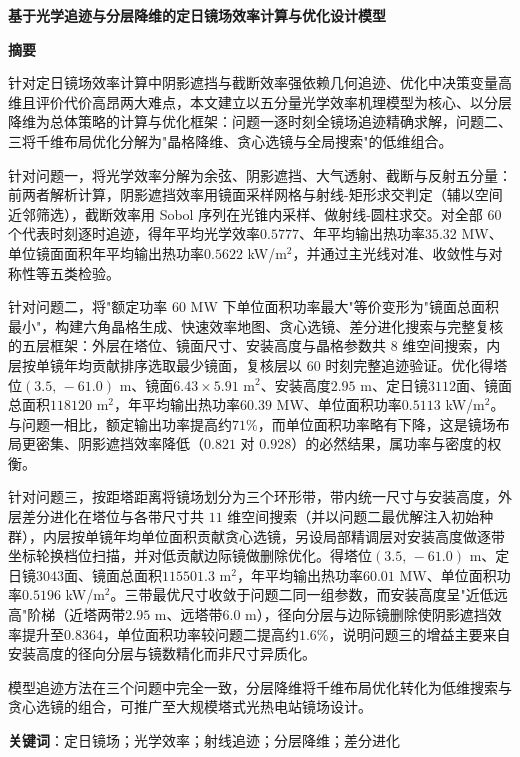 \documentclass[12pt,a4paper,fontset=fandol]{ctexart}
\newcommand{\abstractpage}[2]{%
    \thispagestyle{plain}%
    \pagenumbering{arabic}%
    \setcounter{page}{1}%
    \begin{center}
        {\bfseries\zihao{3} #1}%
    \end{center}
    \vspace{0.5em}
    \begin{center}
        {\bfseries\zihao{4} 摘\quad 要}%
    \end{center}
    \vspace{0.5em}
    #2%
    \vspace{1em}
    \par\noindent\textbf{关键词}：定日镜场；光学效率；射线追迹；分层降维；差分进化
    \newpage
}
\begin{document}
\abstractpage{基于光学追迹与分层降维的定日镜场效率计算与优化设计模型}%
{%
针对定日镜场效率计算中阴影遮挡与截断效率强依赖几何追迹、优化中决策变量高维且评价代价高昂两大难点，本文建立以五分量光学效率机理模型为核心、以分层降维为总体策略的计算与优化框架：问题一逐时刻全镜场追迹精确求解，问题二、三将千维布局优化分解为"晶格降维、贪心选镜与全局搜索"的低维组合。

针对问题一，将光学效率分解为余弦、阴影遮挡、大气透射、截断与反射五分量：前两者解析计算，阴影遮挡效率用镜面采样网格与射线-矩形求交判定（辅以空间近邻筛选），截断效率用 Sobol 序列在光锥内采样、做射线-圆柱求交。对全部 $60$ 个代表时刻逐时追迹，得年平均光学效率$0.5777$、年平均输出热功率$35.32$ MW、单位镜面面积年平均输出热功率$0.5622$ kW/m$^2$，并通过主光线对准、收敛性与对称性等五类检验。

针对问题二，将"额定功率 $60$ MW 下单位面积功率最大"等价变形为"镜面总面积最小"，构建六角晶格生成、快速效率地图、贪心选镜、差分进化搜索与完整复核的五层框架：外层在塔位、镜面尺寸、安装高度与晶格参数共 $8$ 维空间搜索，内层按单镜年均贡献排序选取最少镜面，复核层以 $60$ 时刻完整追迹验证。优化得塔位$(3.5,\,-61.0)$ m、镜面$6.43\times5.91$ m$^2$、安装高度$2.95$ m、定日镜$3112$面、镜面总面积$118120$ m$^2$，年平均输出热功率$60.39$ MW、单位面积功率$0.5113$ kW/m$^2$。与问题一相比，额定输出功率提高约$71\%$，而单位面积功率略有下降，这是镜场布局更密集、阴影遮挡效率降低（$0.821$ 对 $0.928$）的必然结果，属功率与密度的权衡。

针对问题三，按距塔距离将镜场划分为三个环形带，带内统一尺寸与安装高度，外层差分进化在塔位与各带尺寸共 $11$ 维空间搜索（并以问题二最优解注入初始种群），内层按单镜年均单位面积贡献贪心选镜，另设局部精调层对安装高度做逐带坐标轮换档位扫描，并对低贡献边际镜做删除优化。得塔位$(3.5,\,-61.0)$ m、定日镜$3043$面、镜面总面积$115501.3$ m$^2$，年平均输出热功率$60.01$ MW、单位面积功率$0.5196$ kW/m$^2$。三带最优尺寸收敛于问题二同一组参数，而安装高度呈"近低远高"阶梯（近塔两带$2.95$ m、远塔带$6.0$ m），径向分层与边际镜删除使阴影遮挡效率提升至$0.8364$，单位面积功率较问题二提高约$1.6\%$，说明问题三的增益主要来自安装高度的径向分层与镜数精化而非尺寸异质化。

模型追迹方法在三个问题中完全一致，分层降维将千维布局优化转化为低维搜索与贪心选镜的组合，可推广至大规模塔式光热电站镜场设计。
}%
\end{document}
